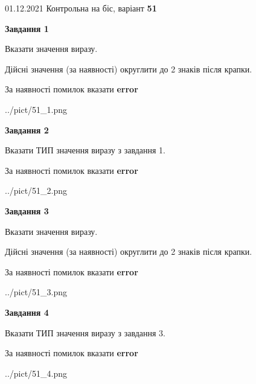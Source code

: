 \documentclass[11pt, ukrainian]{article}
\begin{document}
{01.12.2021 Контрольна на біс, варіант  \No \textbf { 51 }\par}
{
\begin {large}
{\begin {center}\textbf{Завдання 1}\end {center}}\par
Вказати значення виразу. \par
Дійсні значення (за наявності) округлити до 2 знаків після крапки. \par
За наявності помилок вказати \textbf{error}

\begin{center}
	{../pict/51_1.png}
\end{center}
\newpage

{\begin {center}\textbf{Завдання 2}\end {center}}\par
Вказати ТИП значення виразу з завдання 1. \par
За наявності помилок вказати \textbf{error}

\begin{center}
	{../pict/51_2.png}
\end{center}
\newpage

{\begin {center}\textbf{Завдання 3}\end {center}}\par
Вказати значення виразу. \par
Дійсні значення (за наявності) округлити до 2 знаків після крапки. \par
За наявності помилок вказати \textbf{error}

\begin{center}
	{../pict/51_3.png}
\end{center}
\newpage

{\begin {center}\textbf{Завдання 4}\end {center}}\par
Вказати ТИП значення виразу з завдання 3. \par
За наявності помилок вказати \textbf{error}

\begin{center}
	{../pict/51_4.png}
\end{center}
\newpage


\end{large}}
\end{document}
